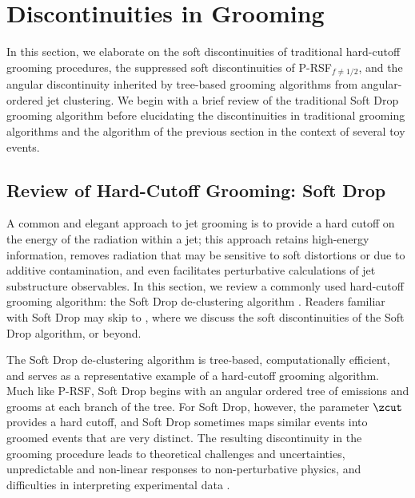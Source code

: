 \documentclass[letterpaper,11pt]{article}
\begin{document}
\section{Discontinuities in Grooming}
\label{sec:traditionaldiscont}
In this section, we elaborate on the soft discontinuities of traditional hard-cutoff grooming procedures, the suppressed soft discontinuities of P-RSF\(_{f\neq 1/2}\), and the angular discontinuity inherited by tree-based grooming algorithms from angular-ordered jet clustering.
%
We begin with a brief review of the traditional Soft Drop grooming algorithm before elucidating the discontinuities in traditional grooming algorithms and the  algorithm of the previous section in the context of several toy events.

\subsection{Review of Hard-Cutoff Grooming: Soft Drop}
\label{sec:softdrop}
A common and elegant approach to jet grooming is to provide a hard cutoff on the energy of the radiation within a jet;
%
this approach retains high-energy information, removes radiation that may be sensitive to soft distortions or due to additive contamination, and even facilitates perturbative calculations of jet substructure observables.
%
In this section, we review a commonly used hard-cutoff grooming algorithm:
%
the Soft Drop de-clustering algorithm \cite{Larkoski:2014wba}.
%
Readers familiar with Soft Drop may skip to , where we discuss the soft discontinuities of the Soft Drop algorithm, or beyond.

The Soft Drop de-clustering algorithm is tree-based, computationally efficient, and serves as a representative example of a hard-cutoff grooming algorithm.
%
Much like P-RSF, Soft Drop begins with an angular ordered tree of emissions and grooms at each branch of the tree.
%
For Soft Drop, however, the parameter \(\zcut\) provides a hard cutoff, and Soft Drop sometimes maps similar events into groomed events that are very distinct.
%
The resulting discontinuity in the grooming procedure leads to theoretical challenges and uncertainties, unpredictable and non-linear responses to non-perturbative physics, and difficulties in interpreting experimental data \cite{ATL-PHYS-PUB-2019-027,Aad:2019vyi,ATLAS:2020gwe}.
\end{document}
